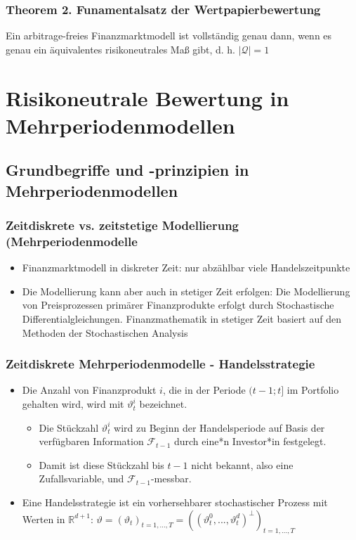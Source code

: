 \documentclass[12pt]{report}
\theoremstyle{dotless}
\theoremstyle{definition}
\begin{document}
\subsubsection{Theorem 2. Funamentalsatz der Wertpapierbewertung}
Ein arbitrage-freies Finanzmarktmodell ist vollständig genau dann, wenn es genau
ein äquivalentes risikoneutrales Maß gibt, d. h. $|\mathcal{Q}| =1$




\section{Risikoneutrale Bewertung in Mehrperiodenmodellen}


\subsection{Grundbegriffe und -prinzipien in Mehrperiodenmodellen }

\subsubsection{Zeitdiskrete vs. zeitstetige Modellierung (Mehrperiodenmodelle}

\begin{itemize}
\item Finanzmarktmodell in diskreter Zeit: nur abzählbar viele Handelszeitpunkte
\item Die Modellierung kann aber auch in stetiger Zeit erfolgen: Die Modellierung von Preisprozessen primärer Finanzprodukte erfolgt durch
Stochastische Differentialgleichungen. Finanzmathematik in stetiger Zeit basiert auf den Methoden der Stochastischen Analysis
\end{itemize}

\subsubsection{Zeitdiskrete Mehrperiodenmodelle - Handelsstrategie}
\begin{itemize}
\item Die Anzahl von Finanzprodukt $i$, die in der Periode $(t - 1; t]$ im Portfolio
gehalten wird, wird mit $\vartheta_t^i$ bezeichnet.
\begin{itemize}
\item Die Stückzahl $\vartheta_t^i$ wird zu Beginn der Handelsperiode auf Basis der verfügbaren Information $\mathcal{F}_{t-1}$ durch eine*n Investor*in festgelegt.
\item Damit ist diese Stückzahl bis $t - 1$ nicht bekannt, also eine Zufallsvariable, und $\mathcal{F}_{t-1}$-messbar.
\end{itemize}
\item  Eine Handelsstrategie ist ein vorhersehbarer stochastischer Prozess mit
Werten in $\mathbb{R}^{d+1}$: $\vartheta=(\vartheta_t)_{t=1,...,T} = ((\vartheta_t^0,...,\vartheta_t^d)^\perp)_{t=1,...,T}$
\end{itemize}
\end{document}
